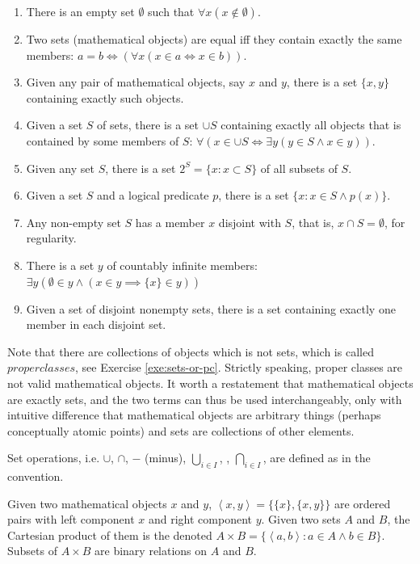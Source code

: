 \documentclass{book}
\theoremstyle{definition}\newtheorem{mechanism}{Mechanism}
\theoremstyle{remark}\newtheorem*{remark}{Remark}
\begin{document}
\begin{enumerate}
	\item There is an empty set $\emptyset$ such that $\forall x(x\notin \emptyset)$.
	\item Two sets (mathematical objects) are equal iff they contain exactly the same members: $a = b \iff (\forall x(x\in a \iff x\in b))$.
	\item Given any pair of mathematical objects, say $x$ and $y$, there is a set $\{x, y\}$ containing exactly such objects.
	\item Given a set $S$ of sets, there is a set $\cup S$ containing exactly all objects that is contained by some members of $S$: $\forall (x \in \cup S \iff \exists y (y\in S \land x\in y))$.
	\item Given any set $S$, there is a set $2^S = \{x: x\subset S\}$ of all subsets of $S$.
	\item Given a set $S$ and a logical predicate $p$, there is a set $\{x: x\in S \land p(x)\}$.
	\item Any non-empty set $S$ has a member $x$ disjoint with $S$, that is, $x\cap S = \emptyset$, for regularity.
	\item There is a set $y$ of countably infinite members: $\exists y(\emptyset \in y \land (x\in y \implies \{x\} \in y))$
	\item Given a set of disjoint nonempty sets, there is a set containing exactly one member in each disjoint set.
\end{enumerate}

Note that there are collections of objects which is not sets, which is called $proper classes$, see Exercise \ref{exe:sets-or-pc}. Strictly speaking, proper classes are not valid mathematical objects. It worth a restatement that mathematical objects are exactly sets, and the two terms can thus be used interchangeably, only with intuitive difference that mathematical objects are arbitrary things (perhaps conceptually atomic points) and sets are collections of other elements.

Set operations, i.e. $\cup$, $\cap$, $-$ (minus), $\bigcup_{i \in I}$, , $\bigcap_{i \in I}$, are defined as in the convention.

Given two mathematical objects $x$ and $y$, $\left<x, y\right> = \{\{x\}, \{x, y\}\}$ are ordered pairs with left component $x$ and right component $y$. Given two sets $A$ and $B$, the Cartesian product of them is the denoted $A\times B = \{\left<a, b\right>: a\in A\land b\in B\}$. Subsets of $A\times B$ are binary relations on $A$ and $B$.
\end{document}
